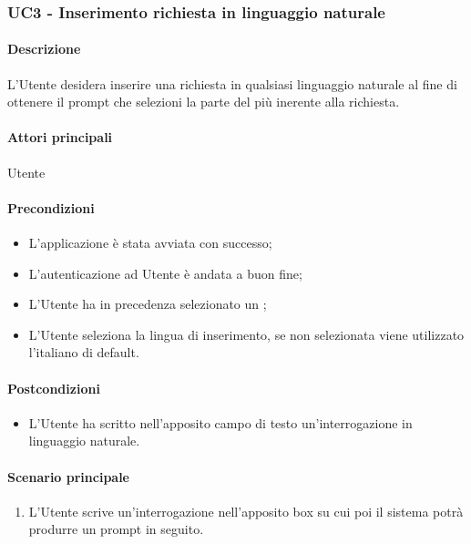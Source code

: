 \subsubsection{UC3 - Inserimento richiesta in linguaggio naturale}\label{UC3}
\paragraph*{Descrizione}
L’Utente desidera inserire una richiesta in qualsiasi linguaggio naturale al fine di ottenere il prompt che selezioni la parte del  più inerente alla richiesta. 

\paragraph*{Attori principali}
Utente

\paragraph*{Precondizioni}
\begin{itemize}
  \item L'applicazione è stata avviata con successo;
  \item L’autenticazione ad Utente è andata a buon fine;
  \item L’Utente ha in precedenza selezionato un ; 
  \item L'Utente seleziona la lingua di inserimento, se non selezionata viene utilizzato l'italiano di default.
\end{itemize}

\paragraph*{Postcondizioni}
\begin{itemize}
  \item L’Utente ha scritto nell’apposito campo di testo un'interrogazione in linguaggio naturale.
\end{itemize}

\paragraph*{Scenario principale}
\begin{enumerate}
  \item L’Utente scrive un'interrogazione nell’apposito box su cui poi il sistema potrà produrre un prompt in seguito.
\end{enumerate}

